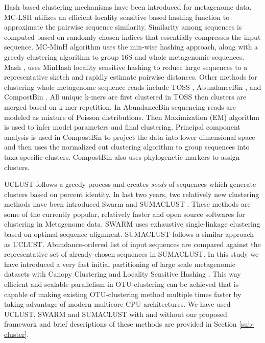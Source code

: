 \documentclass[10pt, conference, compsocconf]{IEEEtran}
\begin{document}
Hash based clustering mechanisms have been introduced for metagenome data. MC-LSH \cite{MARMetaLSH} utilizes an efficient locality sensitive based hashing function to approximate the pairwise sequence similarity. Similarity among sequences is computed based on randomly chosen indices that essentially compresses the input sequence. MC-MinH \cite{MARMcMinH} algorithm uses the min-wise \cite{MARMinWise} hashing approach, along with a greedy clustering algorithm to group 16S and whole metagenomic sequences. Mash \cite{MAROtherMinH}, uses MinHash locality sensitive hashing to reduce large sequences to a representative sketch and rapidly estimate pairwise distances. Other methods for clustering whole metagenome sequence reads include TOSS \cite{MARToss}, AbundanceBin \cite{MARAbundant}, and CompostBin \cite{MARCompost}. All unique k-mers are first clustered in TOSS then clusters are merged based on k-mer repetition. In AbundanceBin sequencing reads are modeled as mixture of Poisson distributions. Then Maximization (EM) algorithm is used to infer model parameters and final clustering. Principal component analysis is used in CompostBin to project the data into lower dimensional space and then uses the normalized cut clustering \cite{MARNormalizedCut} algorithm to group sequences into taxa specific clusters. CompostBin also uses phylogenetic markers to assign clusters.

UCLUST \cite{MARuclust} follows a greedy process and creates \textit{seeds} of sequences which generate clusters based on percent identity. In last two years, two relatively new clustering methods have been introduced Swarm \cite{MARSwarm}\cite{MARSwarm2} and SUMACLUST \cite{MARSumaclust}. These methods are some of the currently popular, relatively faster \cite{MARDeNovo} and open source softwares for clustering in Metagenome data. SWARM uses exhaustive single-linkage clustering based on optimal sequence alignment. SUMACLUST follows a similar approach as UCLUST. Abundance-ordered list of input sequences are compared against the representative set of already-chosen sequences in SUMACLUST. In this study we have introduced a very fast initial partitioning of large scale metagenomic datasets with Canopy Clustering \cite{MARCanopy} and Locality Sensitive Hashing \cite{MARLshRef1}\cite{MARLshRef2}\cite{MARLshRef3}. This way efficient and scalable parallelism in OTU-clustering can be achieved that is capable of making existing OTU-clustering method multiple times faster by taking advantage of modern multicore CPU architectures. We have used UCLUST, SWARM and SUMACLUST with and without our proposed framework and brief descriptions of these methods are provided in Section \ref{sub-cluster}.
\end{document}
